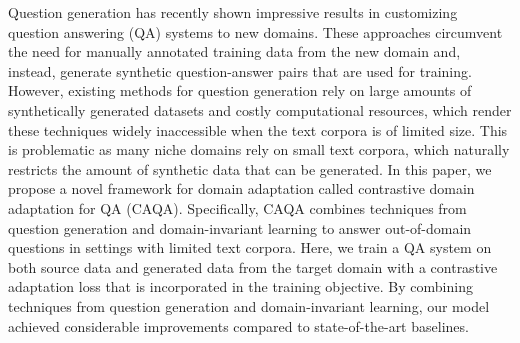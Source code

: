 Question generation has recently shown impressive results in customizing question answering (QA) systems to new domains. These approaches circumvent the need for manually annotated training data from the new domain and, instead, generate synthetic question-answer pairs that are used for training. However, existing methods for question generation rely on large amounts of synthetically generated datasets and costly computational resources, which render these techniques widely inaccessible when the text corpora is of limited size. This is problematic as many niche domains rely on small text corpora, which naturally restricts the amount of synthetic data that can be generated. In this paper, we propose a novel framework for domain adaptation called contrastive domain adaptation for QA (CAQA). Specifically, CAQA combines techniques from question generation and domain-invariant learning to answer out-of-domain questions in settings with limited text corpora. Here, we train a QA system on both source data and generated data from the target domain with a contrastive adaptation loss that is incorporated in the training objective. By combining techniques from question generation and domain-invariant learning, our model achieved considerable improvements compared to state-of-the-art baselines.
